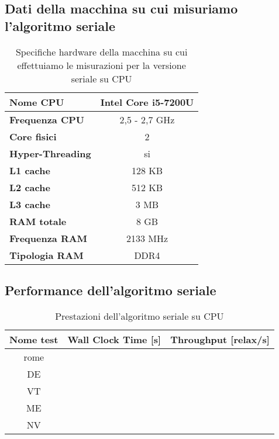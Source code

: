 \documentclass{article}
\begin{document}
	\subsection{Dati della macchina su cui misuriamo l'algoritmo seriale}
	\begin{table}[!ht]
		\centering
		\begin{tabular}{|l|c|}
			\hline
			\textbf{Nome CPU} & Intel Core i5-7200U \\ \hline
			\textbf{Frequenza CPU} & 2,5 - 2,7 GHz \\ \hline
			\textbf{Core fisici} & 2 \\ \hline
			\textbf{Hyper-Threading} & si \\ \hline
			\textbf{L1 cache} & 128 KB \\ \hline
			\textbf{L2 cache} & 512 KB \\ \hline
			\textbf{L3 cache} & 3 MB \\ \hline
			\textbf{RAM totale} & 8 GB \\ \hline
			\textbf{Frequenza RAM} & 2133 MHz \\ \hline
			\textbf{Tipologia RAM} & DDR4 \\ \hline
		\end{tabular}
		\label{tab:specs_serial_cpu}
		\caption{Specifiche hardware della macchina su cui effettuiamo le misurazioni per la versione seriale su CPU}
	\end{table}

	\subsection{Performance dell'algoritmo seriale}
	\begin{table}[!ht]
		\centering
		\begin{tabular}{|c|c|c|}
			\hline
			\textbf{Nome test} & \textbf{Wall Clock Time [s]} & \textbf{Throughput [relax/s]} \\ \hline
			       rome        &                          &                     \\ \hline
			        DE         &                          &                     \\ \hline
			        VT         &                          &                     \\ \hline
			        ME         &                          &                     \\ \hline
			        NV         &                          &                     \\ \hline
		\end{tabular}
		\label{tab:performance_serial}
		\caption{Prestazioni dell'algoritmo seriale su CPU}
	\end{table}
	
\end{document}
